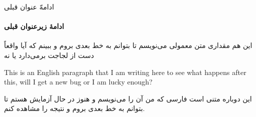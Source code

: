 \documentclass{beamer}
\begin{document}
\begin{frame}{ادامهّ عنوان قبلی}
\framesubtitle{ادامهٔ زیرعنوان قبلی}
این هم مقداری متن معمولی می‌نویسم تا بتوانم به خط بعدی بروم و ببینم که آیا واقعاً  دست از لجاجت برمی‌دارد یا نه
\begin{roman}
This is an English paragraph that I am writing here to see what happens after this, will I get a new bug or I am lucky enough?
\end{roman}
این دوباره متنی است فارسی که من آن را می‌نویسم و هنوز در حال آزمایش هستم تا بتوانم به خط بعدی بروم و نتیجه را مشاهده کنم.
\end{frame}
\end{document}
